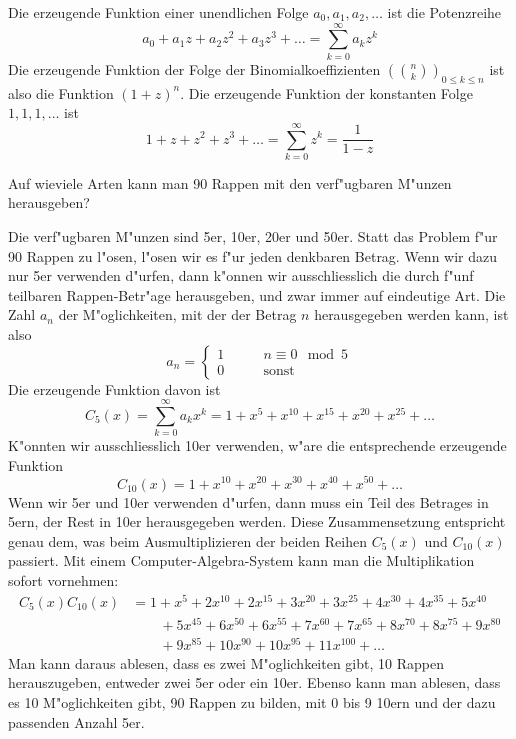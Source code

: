 Die erzeugende Funktion einer unendlichen Folge $a_0,a_1,a_2,\dots$ ist
die Potenzreihe
\[
a_0+a_1z+a_2z^2+a_3z^3+\dots=\sum_{k=0}^\infty a_kz^k
\]
Die erzeugende Funktion der Folge der Binomialkoeffizienten $\left(\binom{n}{k}\right)_{0\le k\le  n}$ ist also die Funktion $(1+z)^n$.
Die erzeugende Funktion der konstanten Folge $1,1,1,\dots$ ist
\[
1+z+z^2+z^3+\dots=\sum_{k=0}^\infty z^k=\frac1{1-z}
\]

\begin{beispiele}
\item 
Auf wieviele Arten kann man 90 Rappen mit den verf"ugbaren M"unzen
herausgeben?

Die verf"ugbaren M"unzen sind 5er, 10er, 20er und 50er.
Statt das Problem f"ur 90 Rappen zu l"osen, l"osen wir es f"ur jeden
denkbaren Betrag.
Wenn wir dazu nur 5er verwenden d"urfen, dann k"onnen wir ausschliesslich
die durch f"unf teilbaren Rappen-Betr"age herausgeben, und zwar immer
auf eindeutige Art. Die Zahl $a_n$ der M"oglichkeiten, mit der der Betrag
$n$ herausgegeben werden kann, ist also
\[
a_n = \begin{cases}
1&\qquad n\equiv 0\mod 5\\
0&\qquad \text{sonst}
\end{cases}
\]
Die erzeugende Funktion davon ist
\[
C_5(x)=\sum_{k=0}^\infty a_kx^k=1+x^5+x^{10}+x^{15}+x^{20}+x^{25}+\dots
\]
K"onnten wir ausschliesslich 10er verwenden, w"are die entsprechende
erzeugende Funktion
\[
C_{10}(x)=1+x^{10}+x^{20}+x^{30}+x^{40}+x^{50}+\dots
\]
Wenn wir 5er und 10er verwenden d"urfen, dann muss ein Teil des Betrages
in 5ern, der Rest in 10er herausgegeben werden.
Diese Zusammensetzung entspricht genau dem, was beim Ausmultiplizieren
der beiden Reihen $C_5(x)$ und $C_{10}(x)$ passiert. Mit einem Computer-Algebra-System kann man die Multiplikation sofort vornehmen:
\begin{align*}
C_5(x)C_{10}(x)&=
 1+x^5+2 x^{10}+2 x^{15}+3 x^{20}+3 x^{25}+4 x^{30}+4 x^{35}+5 x^{40}\\
&\qquad +5 x^{45} +6 x^{50}+6 x^{55}+7 x^{60}+7 x^{65}+8 x^{70}+8 x^{75}+9 x^{80}\\
&\qquad +9 x^{85}+10 x^{90}+10 x^{95}+11 x^{100}+\dots
\end{align*}
Man kann daraus ablesen, dass es zwei M"oglichkeiten gibt, 10 Rappen
herauszugeben, entweder zwei 5er oder ein 10er. Ebenso kann man ablesen,
dass es 10 M"oglichkeiten gibt, 90 Rappen zu bilden, mit 0 bis 9 10ern
und der dazu passenden Anzahl 5er.


\end{beispiele}
